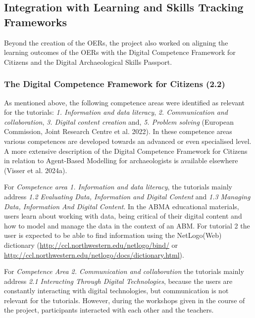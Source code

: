 \documentclass[
]{article}
\begin{document}
\hypertarget{integration-with-learning-and-skills-tracking-frameworks}{%
\subsection{Integration with Learning and Skills Tracking Frameworks}\label{integration-with-learning-and-skills-tracking-frameworks}}

Beyond the creation of the OERs, the project also worked on aligning the learning outcomes of the OERs with the Digital Competence Framework for Citizens and the Digital Archaeological Skills Passport.

\hypertarget{the-digital-competence-framework-for-citizens-2.2}{%
\subsubsection{The Digital Competence Framework for Citizens (2.2)}\label{the-digital-competence-framework-for-citizens-2.2}}

As mentioned above, the following competence areas were identified as relevant for the tutorials: \emph{1. Information and data literacy}, \emph{2. Communication and collaboration}, \emph{3. Digital content creation} and, \emph{5. Problem solving} (European Commission, Joint Research Centre et al. 2022). In these competence areas various competences are developed towards an advanced or even specialised level. A more extensive description of the Digital Competence Framework for Citizens in relation to Agent-Based Modelling for archaeologists is available elsewhere (Visser et al. 2024a).

For \emph{Competence area 1. Information and data literacy}, the tutorials mainly address \emph{1.2 Evaluating Data, Information and Digital Content} and \emph{1.3 Managing Data, Information And Digital Content}. In the ABMA educational materials, users learn about working with data, being critical of their digital content and how to model and manage the data in the context of an ABM. For tutorial 2 the user is expected to be able to find information using the NetLogo(Web) dictionary (\url{http://ccl.northwestern.edu/netlogo/bind/} or \url{http://ccl.northwestern.edu/netlogo/docs/dictionary.html}).

For \emph{Competence Area 2. Communication and collaboration} the tutorials mainly address \emph{2.1 Interacting Through Digital Technologies}, because the users are constantly interacting with digital technologies, but communication is not relevant for the tutorials. However, during the workshops given in the course of the project, participants interacted with each other and the teachers.
\end{document}
